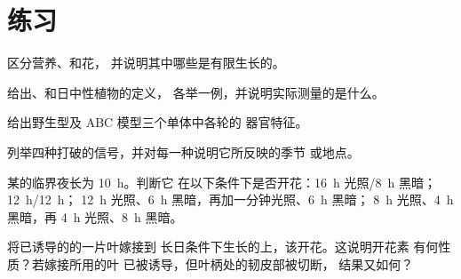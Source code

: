\section{练习}

\begin{exercise}[$\star$]\label{exo:b2:plant-flowering:1}
区分营养、和花，
并说明其中哪些是有限生长的。
\end{exercise}

\begin{exercise}[$\star$]\label{exo:b2:plant-flowering:2}
给出、和日中性植物的定义，
各举一例，并说明实际测量的是什么。
\end{exercise}

\begin{exercise}[$\star$]\label{exo:b2:plant-flowering:3}
给出野生型及 ABC 模型三个单体中各轮的
器官特征。
\end{exercise}

\begin{exercise}[$\star$]\label{exo:b2:plant-flowering:4}
列举四种打破的信号，并对每一种说明它所反映的季节
或地点。
\end{exercise}

\begin{exercise}[$\star\star$]\label{exo:b2:plant-flowering:5}
某的临界夜长为 \qty{10}{h}。判断它
在以下条件下是否开花：\qty{16}{h} 光照/\qty{8}{h} 黑暗；\qty{12}{h}/\qty{12}{h}；
\qty{12}{h} 光照、\qty{6}{h} 黑暗，再加一分钟光照、\qty{6}{h} 黑暗；
\qty{8}{h} 光照、\qty{4}{h} 黑暗，再 \qty{4}{h} 光照、\qty{8}{h} 黑暗。
\end{exercise}

\begin{exercise}[$\star\star$]\label{exo:b2:plant-flowering:6}
将已诱导的的一片叶嫁接到
长日条件下生长的上，该开花。这说明开花素
有何性质？若嫁接所用的叶
已被诱导，但叶柄处的韧皮部被切断，
结果又如何？
\end{exercise}

